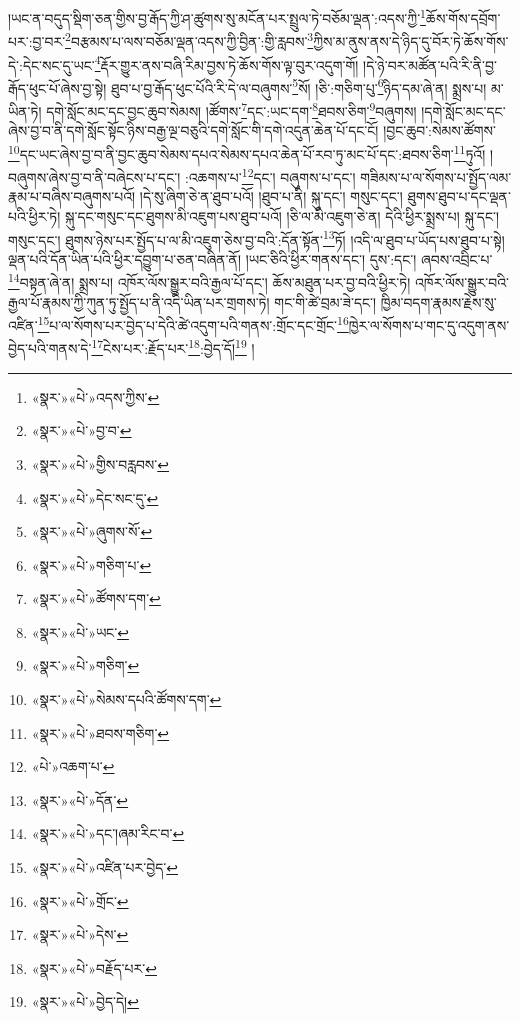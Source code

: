།ཡང་ན་བདུད་སྡིག་ཅན་གྱིས་བྱ་རྒོད་ཀྱི་ཤ་ཚུགས་སུ་མངོན་པར་སྤྲུལ་ཏེ་བཅོམ་ལྡན་:འདས་ཀྱི་\footnote{«སྣར་»«པེ་»འདས་ཀྱིས་}ཆོས་གོས་དབྲོག་པར་:བྱ་བར་\footnote{«སྣར་»«པེ་»བྱ་བ་}བརྩམས་པ་ལས་བཅོམ་ལྡན་འདས་ཀྱི་བྱིན་:གྱི་རླབས་\footnote{«སྣར་»«པེ་»གྱིས་བརླབས་}ཀྱིས་མ་ནུས་ནས་དེ་ཉིད་དུ་བོར་ཏེ་ཆོས་གོས་དེ་:དེང་སང་དུ་ཡང་\footnote{«སྣར་»«པེ་»དེང་སང་དུ་}རྡོར་གྱུར་ནས་བཞི་རིམ་བྱས་ཏེ་ཆོས་གོས་ལྟ་བུར་འདུག་གོ། །དེ་ཉེ་བར་མཚོན་པའི་རི་ནི་བྱ་རྒོད་ཕུང་པོ་ཞེས་བྱ་སྟེ། ཐུབ་པ་བྱ་རྒོད་ཕུང་པོའི་རི་དེ་ལ་བཞུགས་\footnote{«སྣར་»«པེ་»ཞུགས་སོ་}སོ། །ཅི་:གཅིག་པུ་\footnote{«སྣར་»«པེ་»གཅིག་པ་}ཉིད་དམ་ཞེ་ན། སྨྲས་པ། མ་ཡིན་ཏེ། དགེ་སློང་མང་དང་བྱང་ཆུབ་སེམས། །ཚོགས་\footnote{«སྣར་»«པེ་»ཚོགས་དག་}དང་:ཡང་དག་\footnote{«སྣར་»«པེ་»ཡང་}ཐབས་ཅིག་\footnote{«སྣར་»«པེ་»གཅིག་}བཞུགས། །དགེ་སློང་མང་དང་ཞེས་བྱ་བ་ནི་དགེ་སློང་སྟོང་ཉིས་བརྒྱ་ལྔ་བཅུའི་དགེ་སློང་གི་དགེ་འདུན་ཆེན་པོ་དང་ངོ། །བྱང་ཆུབ་:སེམས་ཚོགས་\footnote{«སྣར་»«པེ་»སེམས་དཔའི་ཚོགས་དག་}དང་ཡང་ཞེས་བྱ་བ་ནི་བྱང་ཆུབ་སེམས་དཔའ་སེམས་དཔའ་ཆེན་པོ་རབ་ཏུ་མང་པོ་དང་:ཐབས་ཅིག་\footnote{«སྣར་»«པེ་»ཐབས་གཅིག་}ཏུའོ། །བཞུགས་ཞེས་བྱ་བ་ནི་བཞེངས་པ་དང་། :འཆགས་པ་\footnote{«པེ་»འཆག་པ་}དང་། བཞུགས་པ་དང་། གཟིམས་པ་ལ་སོགས་པ་སྤྱོད་ལམ་རྣམ་པ་བཞིས་བཞུགས་པའོ། །དེ་སུ་ཞིག་ཅེ་ན་ཐུབ་པའོ། །ཐུབ་པ་ནི། སྐུ་དང་། གསུང་དང་། ཐུགས་ཐུབ་པ་དང་ལྡན་པའི་ཕྱིར་ཏེ། སྐུ་དང་གསུང་དང་ཐུགས་མི་འཇུག་པས་ཐུབ་པའོ། །ཅི་ལ་མི་འཇུག་ཅེ་ན། དེའི་ཕྱིར་སྨྲས་པ། སྐུ་དང་། གསུང་དང་། ཐུགས་ཉེས་པར་སྤྱོད་པ་ལ་མི་འཇུག་ཅེས་བྱ་བའི་:དོན་སྟོན་\footnote{«སྣར་»«པེ་»དོན་}ཏོ། །འདི་ལ་ཐུབ་པ་ཡོད་པས་ཐུབ་པ་སྟེ། ལྡན་པའི་དོན་ཡིན་པའི་ཕྱིར་དབྱུག་པ་ཅན་བཞིན་ནོ། །ཡང་ཅིའི་ཕྱིར་གནས་དང་། དུས་:དང་། ཞབས་འབྲིང་པ་\footnote{«སྣར་»«པེ་»དང་།ཞམ་རིང་བ་}བསྟན་ཞེ་ན། སྨྲས་པ། འཁོར་ལོས་སྒྱུར་བའི་རྒྱལ་པོ་དང་། ཆོས་མཐུན་པར་བྱ་བའི་ཕྱིར་ཏེ། འཁོར་ལོས་སྒྱུར་བའི་རྒྱལ་པོ་རྣམས་ཀྱི་ཀུན་ཏུ་སྤྱོད་པ་ནི་འདི་ཡིན་པར་གྲགས་ཏེ། གང་གི་ཚེ་བྲམ་ཟེ་དང་། ཁྱིམ་བདག་རྣམས་རྗེས་སུ་འཛིན་\footnote{«སྣར་»«པེ་»འཛིན་པར་བྱེད་}པ་ལ་སོགས་པར་བྱེད་པ་དེའི་ཚེ་འདུག་པའི་གནས་:གྲོང་དང་གྲོང་\footnote{«སྣར་»«པེ་»གྲོང་}ཁྱེར་ལ་སོགས་པ་གང་དུ་འདུག་ནས་བྱེད་པའི་གནས་དེ་\footnote{«སྣར་»«པེ་»དེས་}ངེས་པར་:རྗོད་པར་\footnote{«སྣར་»«པེ་»བརྗོད་པར་}:བྱེད་དོ།\footnote{«སྣར་»«པེ་»བྱེད་དེ།} །
